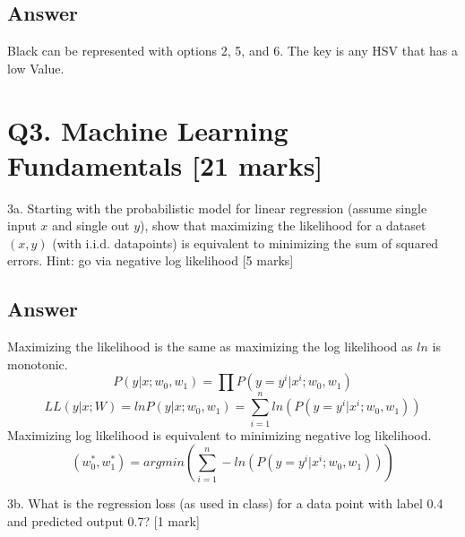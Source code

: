 \documentclass[
	12pt, %
]{fphw}
\begin{document}
\subsection*{Answer}
Black can be represented with options 2, 5, and 6. The key is any HSV that has a low Value.
\section*{Q3. Machine Learning Fundamentals [21 marks]}

\begin{problem}
3a. Starting with the probabilistic model for linear regression (assume single input $x$ and
single out $y$), show that maximizing the likelihood for a dataset $(x,y)$ (with i.i.d.
datapoints) is equivalent to minimizing the sum of squared errors. Hint: go via negative
log likelihood [5 marks]
\end{problem}
\subsection*{Answer}
Maximizing the likelihood is the same as maximizing the log likelihood as $ln$ is monotonic. 
\begin{equation}
	P(y \vert x; w_0, w_1) = \prod P(y=y^i \vert x^i; w_0, w_1)
\end{equation}
\begin{equation}
	LL(y \vert x; W) = ln P(y \vert x; w_0, w_1) =  \sum^n_{i=1}ln(P(y=y^i \vert x^i; w_0, w_1))
\end{equation}
Maximizing log likelihood is equivalent to minimizing negative log likelihood.
\begin{equation}
	(w^*_0, w^*_1) = argmin(\sum^n_{i=1}-ln(P(y=y^i \vert x^i; w_0, w_1)))
\end{equation}
\begin{problem}
3b. What is the regression loss (as used in class) for a data point with label 0.4 and
predicted output 0.7? [1 mark]
\end{problem}
\end{document}

